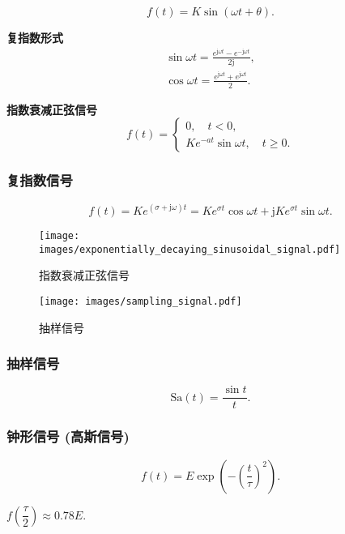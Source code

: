 \rmg
\begin{equation}
    f(t)=K\sin(\omega t+\theta).
\end{equation}

\textbf{复指数形式}
\begin{equation}
    \begin{gathered}
        \sin\omega t=\frac{e^{\mathrm{j}\omega t}-e^{-\mathrm{j}\omega t}}{2\mathrm{j}}, \\
        \cos\omega t=\frac{e^{\mathrm{j}\omega t}+e^{\mathrm{j}\omega t}}{2}.
    \end{gathered}
\end{equation}

\textbf{指数衰减正弦信号}
\begin{equation}
    f(t)=\begin{cases}
        0,\quad t<0, \\
        Ke^{-at}\sin\omega t,\quad t\geq 0.
    \end{cases}
\end{equation}

\subsubsection{复指数信号}

\rmg
\begin{equation}
    f(t)=Ke^{(\sigma+\mathrm{j}\omega)t}=Ke^{\sigma t}\cos\omega t+\mathrm{j}Ke^{\sigma t}\sin\omega t.
\end{equation}

\begin{figure}[ht]
    \centering
    \begin{minipage}{.47\textwidth}
        \centering
        \texttt{[image: images/exponentially\_decaying\_sinusoidal\_signal.pdf]}
        \caption{指数衰减正弦信号}
    \end{minipage}
    \begin{minipage}{.43\textwidth}
        \centering
        \texttt{[image: images/sampling\_signal.pdf]}
        \caption{抽样信号}
    \end{minipage}
\end{figure}

\subsubsection{抽样信号}

\rmg
\begin{equation}
    \mathrm{Sa}(t)=\frac{\sin t}{t}.
\end{equation}

\subsubsection{钟形信号 (高斯信号)}

\rmg
\begin{equation}
    f(t)=E\exp\left(-\left(\frac{t}{\tau}\right)^2\right).
\end{equation}

$f\left(\dfrac{\tau}{2}\right)\approx 0.78E$.
